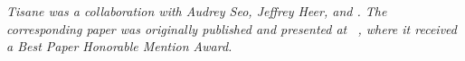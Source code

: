




\textit{Tisane was a collaboration with Audrey Seo, Jeffrey
Heer, and \reneJust. The corresponding paper was originally published and presented at
~\cite{jun2022tisane}, where it received a \textit{Best Paper Honorable
Mention Award}.}
